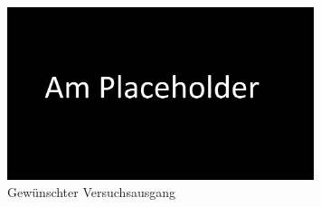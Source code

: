\begin{figure}
\centering
\includegraphics[width=0.8\textwidth]{papers/wirbelringe/fig/wirbelringversuch.png}
\caption{Gewünschter Versuchsausgang \label{buch:papers:Wirbelringe:fig:wirbelringversuch}}
\end{figure}